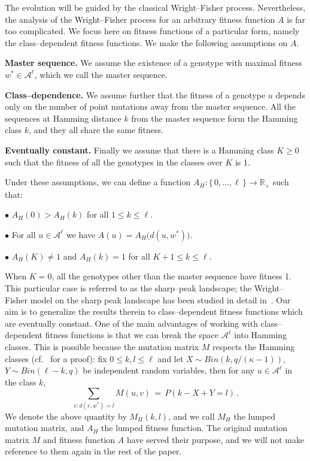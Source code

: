 \documentclass[a4paper,12pt]{article}
\theoremstyle{definition}
\theoremstyle{remark}
\def \cA {\mathcal{A}}
\def \k {\kappa}
\def \R {\mathbb{R}}
\def \zl {\{\, 0,\dots,\ell \,\}}
\begin{document}
The evolution will be guided by the classical Wright--Fisher process.
Nevertheless, the analysis of the Wright--Fisher process for an arbitrary fitness function $A$
is far too complicated. We focus here on fitness functions of a particular form,
namely the class--dependent fitness functions. We make the following assumptions on $A$.

\textbf{Master sequence.} We assume the existence of a genotype with maximal fitness
$w^*\in\cA^\ell$, which we call the master sequence.

\textbf{Class--dependence.} We assume further that the fitness of a 
genotype $u$ depends only on the number of point mutations away from the master sequence.
All the sequences at Hamming distance $k$ from the master sequence
form the Hamming class $k$, and they all share the same fitness.

\textbf{Eventually constant.}
Finally we assume that there is a Hamming class $K\geq0$ such that 
the fitness of all the genotypes in the classes over $K$ is 1.

Under these assumptions,
we can define a function $A_H:\zl\to\R_+$ such that:

$\bullet$ $A_H(0)>A_H(k)$ for all $1\leq k\leq \ell$.

$\bullet$ For all $u\in\cA^{\ell}$ we have $A(u)=A_H\big(d(u,w^*)\big)$.

$\bullet$ $A_H(K)\neq 1$ and $A_H(k)=1$ for all $K+1\leq k\leq \ell$.

When $K=0$, 
all the genotypes other than the master sequence have fitness 1.
This particular case is referred to as the sharp--peak landscape;
the Wright--Fisher model on the sharp peak landscape
has been studied in detail in~\cite{CerfWF,DWF}.
Our aim is to generalize the results therein
to class--dependent fitness functions which are eventually constant.
One of the main advantages of working with class--dependent
fitness functions is that we can break the space $\cA^\ell$ into Hamming classes.
This is possible because the mutation matrix $M$ respects the Hamming classes (cf.~\cite{CerfWF} for a proof):
fix $0\leq k,l\leq \ell$ and let $X\sim Bin(k,q/(\k-1))$, $Y\sim Bin(\ell-k,q)$
be independent random variables, then for any $u\in\cA^\ell$ in the class $k$,
$$\sum_{v:d(v,w^*)=l}M(u,v)\,=\,P(
k-X+Y=l
)\,.$$
We denote the above quantity by $M_H(k,l)$, and we call $M_H$
the lumped mutation matrix, and $A_H$ the lumped fitness function.
The original mutation matrix $M$ and fitness function $A$ have served their purpose,
and we will not make reference to them again in the rest of the paper.
\end{document}
